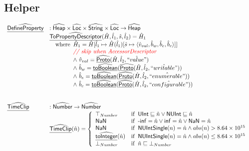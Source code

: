 \subsection{Helper}
\[
\begin{array}{ll}

\widehat{\underline{\sf DefineProperty}} & : \widehat{\mbox{\textsf{Heap}}} \times \widehat{\mbox{\textsf{Loc}}} \times \widehat{\mbox{\textsf{String}}} \times \widehat{\mbox{\textsf{Loc}}} \rightarrow \widehat{\mbox{\textsf{Heap}}} \\
& \widehat{\underline{\sf ToPropertyDescriptor}}(\hat{H}, \hat{l}_1, \hat{s}, \hat{l}_2 ) = \hat{H}_1\\
& \quad {\rm where}\begin{array}[t]{l}
  \hat{H}_1 = \hat{H}[\hat{l}_1 \mapsto \hat{H}(\hat{l}_1)
    [\hat{s}\mapsto \langle \hat{v}_{val}, \hat{b}_{w}, \hat{b}_{e}, \hat{b}_{c}  \rangle]]\\
  \textit{{\color{red}// skip when AccessorDescriptor}}\\
  \land\ \hat{v}_{val} = \widehat{\underline{\sf Proto}}(\hat{H}, \hat{l}_2, \hat{``value"})\\
  \land\ \hat{b}_{w} = \widehat{\underline{\sf toBoolean}}(\widehat{\underline{\sf Proto}}(\hat{H}, \hat{l}_2, \hat{``writable"}))\\
  \land\ \hat{b}_{e} = \widehat{\underline{\sf toBoolean}}(\widehat{\underline{\sf Proto}}(\hat{H}, \hat{l}_2, \hat{``enumerable"}))\\    
  \land\ \hat{b}_{c} = \widehat{\underline{\sf toBoolean}}(\widehat{\underline{\sf Proto}}(\hat{H}, \hat{l}_2, \hat{``configurable"}))\\
  \end{array}\\
\\\\


\widehat{\underline{\sf TimeClip}} & : \widehat{\mbox{\textsf{Number}}} \rightarrow \widehat{\mbox{\textsf{Number}}} \\
& \widehat{\underline{\sf TimeClip}}(\hat{n}) = \left\{
      \begin{array}{ll}
        \top_{Number} & {\rm if}\begin{array}[t]{l}\mbox{\textsf{UInt}} \sqsubseteq \hat{n} \lor \mbox{\textsf{NUInt}} \sqsubseteq \hat{n}\end{array}\\
        \mbox{\textsf{NaN}} & {\rm if}\begin{array}[t]{l}\mbox{\textsf{-inf}} = \hat{n} \lor \mbox{\textsf{inf}} = \hat{n} \lor \mbox{\textsf{NaN}} = \hat{n}\end{array}\\
        \mbox{\textsf{NaN}} & {\rm if}\begin{array}[t]{l}\mbox{\textsf{NUIntSingle}}(n) = \hat{n} \land abs(n) > 8.64 \times 10^{15}\end{array}\\
        \widehat{\underline{\sf toInteger}}(\hat{n}) & {\rm if}\begin{array}[t]{l}\mbox{\textsf{NUIntSingle}}(n) = \hat{n} \land abs(n) \leq 8.64 \times 10^{15}\end{array}\\
        \bot_{Number} & {\rm if}\begin{array}[t]{l}\hat{n} \sqsubseteq \bot_{Number}\end{array}
      \end{array}
    \right.\\
\\
\end{array}
\]

